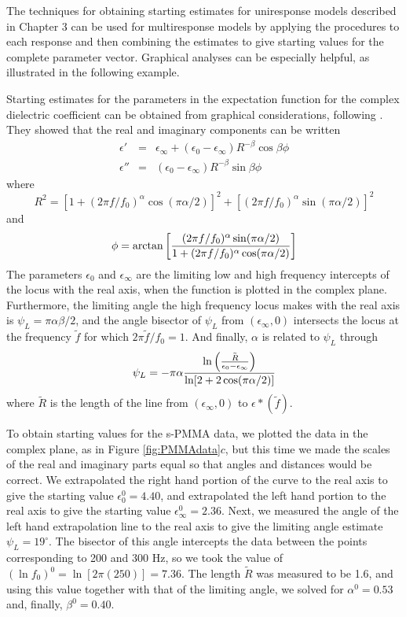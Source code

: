The techniques for obtaining starting estimates for uniresponse
models described in Chapter 3 can be used for multiresponse
models by applying the procedures to each response and
then combining the estimates to give starting values for the complete
parameter vector.
Graphical analyses can be especially helpful, as illustrated in
the following example.

\begin{example}\label{spmma:graph}
Starting estimates for the parameters in the expectation
function for the complex dielectric coefficient can be obtained
from graphical considerations, following .
They showed that the real and imaginary components can be written
  \begin{eqnarray*}
    \epsilon'&=&\epsilon_{\infty} +
    ( \epsilon_0 - \epsilon_{\infty} ) R^{ - \beta }  \cos\beta \phi\\
    \epsilon''&=&
( \epsilon_0 - \epsilon_{\infty} ) R^{{-} \beta}  \sin\beta \phi
  \end{eqnarray*}
where
$$
R^2 =
\left[ 1 + ( 2 \pi f / f_0 )^{\alpha}
\cos ( \pi \alpha / 2 )\right]^2
+ \left[ ( 2 \pi f / f_0 )^{\alpha}
\sin ( \pi \alpha / 2 )\right]^2
$$
and
$$
\phi = \arctan \left[
{ ( 2 \pi f / f_0 )^{\alpha}
\sin ( \pi \alpha / 2 )  
\over   1+( 2 \pi f / f_0 )^{\alpha}
\cos ( \pi \alpha / 2 ) }\right]
$$
The parameters $\epsilon_{0}$ and $\epsilon_{\infty}$ are the
limiting low and high frequency intercepts of the locus with the
real axis, when the function is plotted in the complex plane.
Furthermore, the limiting angle the high frequency locus makes
with the real axis is
$ \psi_L = \pi \alpha \beta / 2 $, and the angle
bisector of $ \psi_L $ from $( \epsilon_{\infty} , 0 )$ intersects the
locus at the frequency $\tilde f $ for which
$2 \pi \tilde f / f_0 = 1$.
And finally, $\alpha$ is related to $ \psi_L $
through
$$
\psi_L = - \pi \alpha
{ \ln \left( \tilde {R \over  \epsilon_0 - \epsilon_{\infty} }\right)  
\over \ln[ 2+2\cos( \pi \alpha / 2 ) ]}
$$
where $\tilde R $ is the length of the line from
$( \epsilon_{\infty} , 0 )$ to $\epsilon * ( \tilde f ) $.

To obtain starting values for the s-PMMA data, we plotted the data
in the complex plane, as in Figure \ref{fig:PMMAdata}$c$, but this time we
made the scales of the real and imaginary parts equal so that angles and
distances would be correct.
We extrapolated the right hand portion of the curve to the real
axis to give the starting value $\epsilon_0^0 = 4.40$, and
extrapolated the left hand portion to the real
axis to give the starting value $\epsilon_{\infty}^0 = 2.36$.
Next, we measured the angle of the left hand extrapolation line to the
real axis to give the limiting angle estimate $\psi_L = 19^\circ$.
The bisector of this angle intercepts the data between the points
corresponding to 200 and 300 Hz, so we took the value of
$(\ln f_0 )^{0}=\ln[ 2 \pi ( 250 )]=7.36$.
The length $\tilde R$ was measured to be 1.6, and
using this value together with that of the limiting angle, we solved for
$\alpha^0 = 0.53$ and, finally, $\beta^0 = 0.40$.
\end{example}

